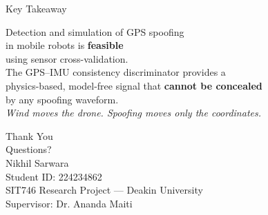 \documentclass[11pt]{beamer}
\begin{document}
\begin{frame}{Key Takeaway}
\vspace{8mm}
\begin{center}
{\LARGE Detection and simulation of GPS spoofing\\[2mm] in mobile robots is \textcolor{blue!60}{\textbf{feasible}}}\\[6mm]
{\large using sensor cross-validation.}\\[8mm]
{\normalsize The GPS--IMU consistency discriminator provides a\\[1mm]
physics-based, model-free signal that \textbf{cannot be concealed}\\[1mm]
by any spoofing waveform.}\\[8mm]
{\large\textit{Wind moves the drone. Spoofing moves only the coordinates.}}
\end{center}
\end{frame}

\begin{frame}
\vspace{15mm}
\begin{center}
{\Huge Thank You}\\[8mm]
{\Large Questions?}\\[12mm]
{\large Nikhil Sarwara}\\[2mm]
{\small Student ID: 224234862}\\[2mm]
{\small SIT746 Research Project — Deakin University}\\[4mm]
{\small Supervisor: Dr. Ananda Maiti}
\end{center}
\end{frame}
\end{document}
